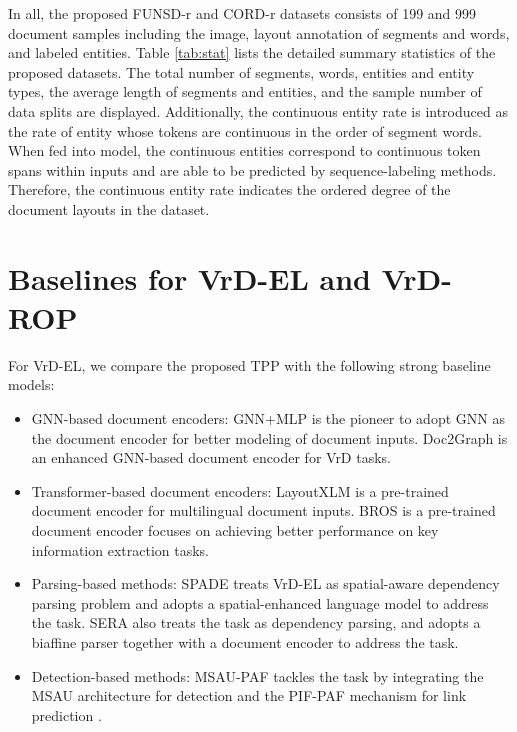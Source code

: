 \documentclass[11pt]{article}
\begin{document}
In all, the proposed  FUNSD-r and CORD-r datasets consists of 199 and 999 document samples including the image, layout annotation of segments and words, and labeled entities. 
Table \ref{tab:stat} lists the detailed summary statistics of the proposed datasets. 
The total number of segments, words, entities and entity types, the average length of segments and entities, and the sample number of data splits are displayed. 
Additionally, the continuous entity rate is introduced as the rate of entity whose tokens are continuous in the order of segment words. 
When fed into model, the continuous entities correspond to continuous token spans within inputs and are able to be predicted by sequence-labeling methods.
Therefore, the continuous entity rate indicates the ordered degree of the document layouts in the dataset. 


\section{Baselines for VrD-EL and VrD-ROP}
\label{sec:baseline}

For VrD-EL, we compare the proposed TPP with the following strong baseline models:
\begin{itemize}[leftmargin=*,noitemsep,topsep=0pt]
    \item GNN-based document encoders: 
    GNN+MLP \citep{carbonell2021named} is the pioneer to adopt GNN as the document encoder for better modeling of document inputs. 
    Doc2Graph \citep{gemelli2022doc2graph} is an enhanced GNN-based document encoder for VrD tasks. 
    \item Transformer-based document encoders: 
    LayoutXLM \citep{xu2021layoutxlm} is a pre-trained document encoder for multilingual document inputs. 
    BROS \citep{hong2022bros} is a pre-trained document encoder focuses on achieving better performance on key information extraction tasks. 
    \item Parsing-based methods: 
    SPADE \citep{hwang2021spatial} treats VrD-EL as spatial-aware dependency parsing problem and adopts a spatial-enhanced language model to address the task.
    SERA \citep{zhang2021entity} also treats the task as dependency parsing, and adopts a biaffine parser together with a document encoder to address the task.
    \item Detection-based methods: 
    MSAU-PAF \citep{dang2021end} tackles the task by integrating the MSAU architecture for detection \citep{dang2021msau} and the PIF-PAF mechanism for link prediction \citep{kreiss2019pifpaf}. 
\end{itemize}
\end{document}
